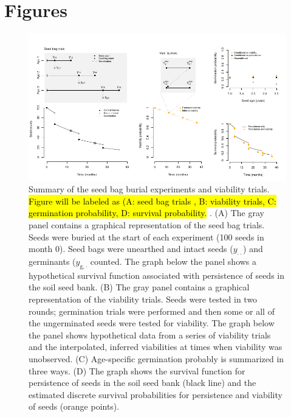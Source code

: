 \documentclass[12pt, oneside]{article}   	%
\begin{document}
\section*{Figures}

 \begin{figure}[!h]
   \centering
       \includegraphics[page=1,width=1\textwidth]{seed-bag-figure.pdf}  
    \caption{ Summary of the seed bag burial experiments and viability trials. \hl{Figure will be labeled as (A: seed bag trials , B: viability trials, C: germination probability, D: survival probability. }. (A) The gray panel contains a graphical representation of the seed bag trials. Seeds were buried at the start of each experiment (100 seeds in month 0). Seed bags were unearthed and intact seeds ($y_{\cdot \cdot}$) and germinants ($y_{\mathrm{g},\cdot}$ counted. The graph below the panel shows a hypothetical survival function associated with persistence of seeds in the soil seed bank. (B) The gray panel contains a graphical representation of the viability trials. Seeds were tested in two rounds; germination trials were performed and then some or all of the ungerminated seeds were tested for viability. The graph below the panel shows hypothetical data from a series of viability trials and the interpolated, inferred viabilities at times when viability was unobserved. (C) Age-specific germination probably is summarized in three ways. (D) The graph shows the survival function for persistence of seeds in the soil seed bank (black line) and the estimated discrete survival probabilities for persistence and viability of seeds (orange points). }
 \label{fig:seed-bag-experiments}
\end{figure}

\clearpage
\newpage
\end{document}
